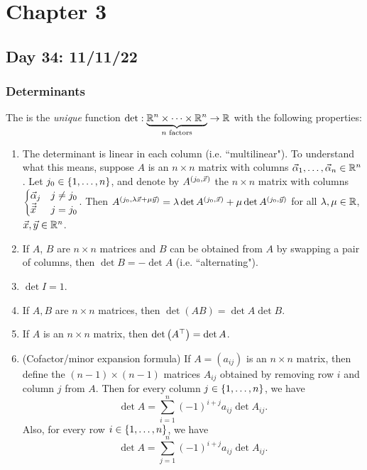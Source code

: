 \documentclass[main.tex]{subfiles}
\begin{document}
\section{Chapter 3}
\subsection{Day 34: 11/11/22}
\subsubsection{Determinants}

\begin{definition}
    The  is the \textit{unique} function $\det : \underbrace{\mathbb R^n\times \cdots \times \mathbb R^n}_{n\text{ factors}} \to \mathbb R$ with the following properties:
    \begin{enumerate}
        \item The determinant is linear in each column (i.e. ``multilinear"). To understand what this means, suppose $A$ is an $n\times n$ matrix with columns $\vec\alpha_1, \ldots , \vec\alpha_n\in \mathbb R^n$. Let $j_0\in \left\{ 1, \ldots , n \right\}$, and denote by $A^{(j_0,\vec{x})}$ the $n\times n$ matrix with columns $\begin{cases}
            \vec\alpha_j & j\neq j_0 \\
            \vec{\vec{x}} & j = j_0
        \end{cases}$. Then $A^{(j_0, \lambda\vec{x} + \mu\vec{y})} = \lambda \det A^{(j_0, \vec{x})} + \mu\det A^{(j_0, \vec{y})}$ for all $\lambda, \mu\in \mathbb R$, $\vec{x}, \vec{y}\in \mathbb R^n$. 
        \item If $A$, $B$ are $n\times n$ matrices and $B$ can be obtained from $A$ by swapping a pair of columns, then $\det B = - \det A$ (i.e. ``alternating").
        \item $\det I = 1$.
        \item If $A, B$ are $n\times n$ matrices, then $\det (AB) = \det A \det B$.
        \item If $A$ is an $n\times n$ matrix, then $\det \left( A^\top \right) = \det A$.
        \item (Cofactor/minor expansion formula) If $A = (a_{ij})$ is an $n\times n$ matrix, then define the $(n - 1)\times (n - 1)$  matrices $A_{ij}$ obtained by removing row $i$ and column $j$ from $A$. Then for every column $j\in \left\{ 1, \ldots , n \right\}$, we have
        \[\det A = \sum_{i = 1}^n (-1)^{i + j}a_{ij}\det A_{ij}.\]
        Also, for every row $i\in \left\{ 1, \ldots , n \right\}$, we have
        \[\det A = \sum_{j = 1}^n (-1)^{i + j}a_{ij}\det A_{ij}.\]
    \end{enumerate}
\end{definition}
\end{document}
